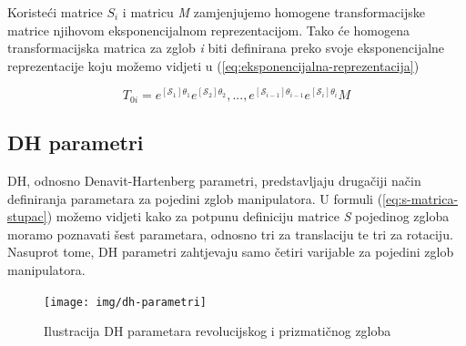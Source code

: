 \documentclass[times, utf8, diplomskirad]{fer}
\begin{document}
Koristeći matrice \textit{$S_i$} i matricu \textit{M} zamjenjujemo homogene transformacijske matrice njihovom eksponencijalnom reprezentacijom.
Tako će homogena transformacijska matrica za zglob \textit{i} biti definirana preko svoje eksponencijalne reprezentacije koju možemo vidjeti u (\ref{eq:eksponencijalna-reprezentacija})

\begin{equation}
     T_{0i}=e^{\left[\mathcal{S}_{1}\right] \theta_{1}}  e^{\left[\mathcal{S}_{2}\right] \theta_{2}} , ..., e^{\left[\mathcal{S}_{i-1}\right] \theta_{i-1}} e^{\left[\mathcal{S}_{i}\right] \theta_{i}} M
    \label{eq:eksponencijalna-reprezentacija}
\end{equation}
\newpage
\subsection{DH parametri}
DH, odnosno Denavit-Hartenberg parametri, predstavljaju drugačiji način definiranja parametara za pojedini zglob manipulatora.
U formuli (\ref{eq:s-matrica-stupac}) možemo vidjeti kako za potpunu definiciju matrice \textit{S} pojedinog zgloba moramo poznavati šest parametara, odnosno tri za translaciju te tri za rotaciju.
Nasuprot tome, DH parametri zahtjevaju samo četiri varijable za pojedini zglob manipulatora.
\begin{figure}[H]
    \centering
    \texttt{[image: img/dh-parametri]}
    \caption{Ilustracija DH parametara revolucijskog i prizmatičnog zgloba}
    \label{fig:dh-parametri}
\end{figure}
\end{document}
